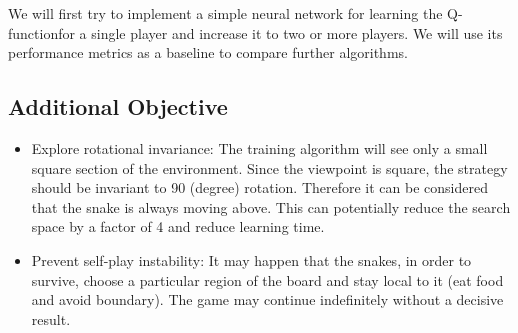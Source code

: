 \documentclass[conference]{IEEEtran}
\begin{document}
We will first try to implement a simple neural network for learning the
Q-functionfor a single player and increase it to two or more players. We will use its performance metrics as a baseline to compare further algorithms.  \newline\par


\subsection{Additional Objective}
\begin{itemize}
	\item{Explore rotational invariance: The training algorithm will see only a
  small square section of the environment. Since the viewpoint is square, the
  strategy should be invariant to 90 (degree) rotation. Therefore it can be
  considered that the snake is always moving above. This can potentially
  reduce the search space by a factor of 4 and reduce learning time.}
	\item{Prevent self-play instability: It may happen that the snakes, in
  order to survive, choose a particular region of the board and stay local
  to it (eat food and avoid boundary). The game may continue indefinitely
  without a decisive result. }
\end{itemize}
\section*{}
\end{document}
